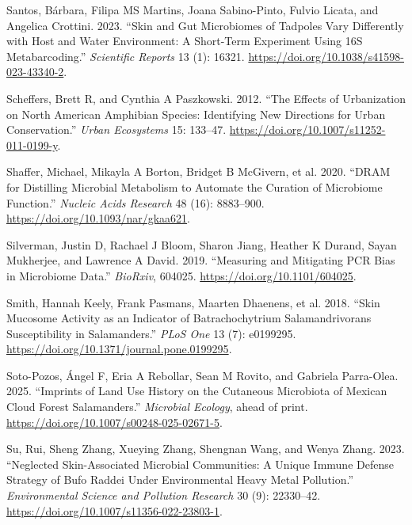 \documentclass[
  12pt,
]{article}
\newlength{\cslhangindent}
\newenvironment{CSLReferences}[2] %
 {\begin{list}{}{%
  \setlength{\itemindent}{0pt}
  \setlength{\leftmargin}{0pt}
  \setlength{\parsep}{0pt}
  \ifodd #1
   \setlength{\leftmargin}{\cslhangindent}
   \setlength{\itemindent}{-1\cslhangindent}
  \fi
  \setlength{\itemsep}{#2\baselineskip}}}
 {\end{list}}
\begin{document}
\begin{CSLReferences}{1}{1}
Santos, Bárbara, Filipa MS Martins, Joana Sabino-Pinto, Fulvio Licata,
and Angelica Crottini. 2023. {``Skin and Gut Microbiomes of Tadpoles
Vary Differently with Host and Water Environment: A Short-Term
Experiment Using {16S} Metabarcoding.''} \emph{Scientific Reports} 13
(1): 16321. \url{https://doi.org/10.1038/s41598-023-43340-2}.

Scheffers, Brett R, and Cynthia A Paszkowski. 2012. {``The Effects of
Urbanization on {North} {American} Amphibian Species: {Identifying} New
Directions for Urban Conservation.''} \emph{Urban Ecosystems} 15:
133--47. \url{https://doi.org/10.1007/s11252-011-0199-y}.

{Shaffer, Michael, Mikayla A Borton, Bridget B McGivern, et al.} 2020.
{``{DRAM} for Distilling Microbial Metabolism to Automate the Curation
of Microbiome Function.''} \emph{Nucleic Acids Research} 48 (16):
8883--900. \url{https://doi.org/10.1093/nar/gkaa621}.

Silverman, Justin D, Rachael J Bloom, Sharon Jiang, Heather K Durand,
Sayan Mukherjee, and Lawrence A David. 2019. {``Measuring and Mitigating
{PCR} Bias in Microbiome Data.''} \emph{BioRxiv}, 604025.
\url{https://doi.org/10.1101/604025}.

Smith, Hannah Keely, Frank Pasmans, Maarten Dhaenens, et al. 2018.
{``Skin Mucosome Activity as an Indicator of {Batrachochytrium}
Salamandrivorans Susceptibility in Salamanders.''} \emph{PLoS One} 13
(7): e0199295. \url{https://doi.org/10.1371/journal.pone.0199295}.

Soto-Pozos, Ángel F, Eria A Rebollar, Sean M Rovito, and Gabriela
Parra-Olea. 2025. {``Imprints of {Land} {Use} {History} on the
{Cutaneous} {Microbiota} of {Mexican} {Cloud} {Forest} {Salamanders}.''}
\emph{Microbial Ecology}, ahead of print.
\url{https://doi.org/10.1007/s00248-025-02671-5}.

Su, Rui, Sheng Zhang, Xueying Zhang, Shengnan Wang, and Wenya Zhang.
2023. {``Neglected Skin-Associated Microbial Communities: A Unique
Immune Defense Strategy of {Bufo} Raddei Under Environmental Heavy Metal
Pollution.''} \emph{Environmental Science and Pollution Research} 30
(9): 22330--42. \url{https://doi.org/10.1007/s11356-022-23803-1}.


\end{CSLReferences}
\end{document}
